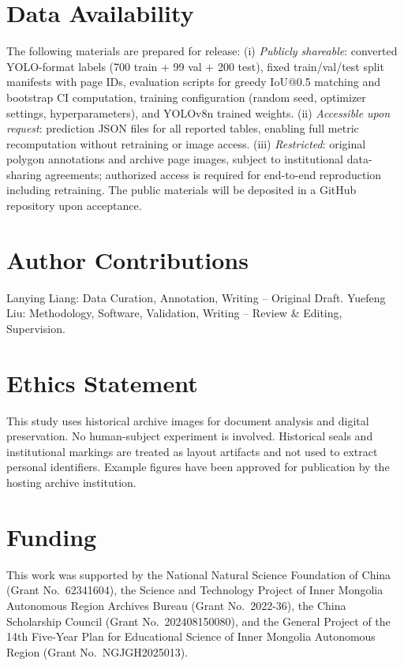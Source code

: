 \documentclass[pdflatex,sn-mathphys-num]{sn-jnl}
\begin{document}
\section*{Data Availability}
The following materials are prepared for release: (i) \emph{Publicly shareable}: converted YOLO-format labels (700 train + 99 val + 200 test), fixed train/val/test split manifests with page IDs, evaluation scripts for greedy IoU@0.5 matching and bootstrap CI computation, training configuration (random seed, optimizer settings, hyperparameters), and YOLOv8n trained weights. (ii) \emph{Accessible upon request}: prediction JSON files for all reported tables, enabling full metric recomputation without retraining or image access. (iii) \emph{Restricted}: original polygon annotations and archive page images, subject to institutional data-sharing agreements; authorized access is required for end-to-end reproduction including retraining. The public materials will be deposited in a GitHub repository upon acceptance.

\section*{Author Contributions}
Lanying Liang: Data Curation, Annotation, Writing -- Original Draft. Yuefeng Liu: Methodology, Software, Validation, Writing -- Review \& Editing, Supervision.

\section*{Ethics Statement}
This study uses historical archive images for document analysis and digital preservation. No human-subject experiment is involved. Historical seals and institutional markings are treated as layout artifacts and not used to extract personal identifiers. Example figures have been approved for publication by the hosting archive institution.

\section*{Funding}
This work was supported by the National Natural Science Foundation of China (Grant No.\ 62341604), the Science and Technology Project of Inner Mongolia Autonomous Region Archives Bureau (Grant No.\ 2022-36), the China Scholarship Council (Grant No.\ 202408150080), and the General Project of the 14th Five-Year Plan for Educational Science of Inner Mongolia Autonomous Region (Grant No.\ NGJGH2025013).
\end{document}
